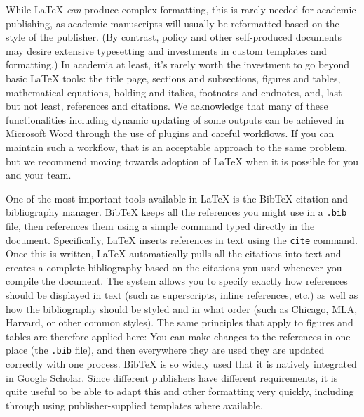 While {\LaTeX} \textit{can} produce complex formatting,
this is rarely needed for academic publishing,
as academic manuscripts will usually be reformatted
based on the style of the publisher.
(By contrast, policy and other self-produced documents may desire
extensive typesetting and investments in custom templates and formatting.)
In academia at least,
it's rarely worth the investment to go beyond basic {\LaTeX} tools:
the title page, sections and subsections,
figures and tables, mathematical equations,
bolding and italics, footnotes and endnotes,
and, last but not least, references and citations.
We acknowledge that many of these functionalities
including dynamic updating of some outputs
can be achieved in Microsoft Word
through the use of plugins and careful workflows.
If you can maintain such a workflow,
that is an acceptable approach to the same problem,
but we recommend moving towards adoption of {\LaTeX}
when it is possible for you and your team.


One of the most important tools available in {\LaTeX}
is the BibTeX citation and bibliography manager.
BibTeX keeps all the references you might use in a \texttt{.bib} file,
then references them using a simple command typed directly in the document.
Specifically, {\LaTeX} inserts references in text using the \texttt{cite} command.
Once this is written, {\LaTeX} automatically pulls all the citations into text
and creates a complete bibliography based on the citations you used whenever you compile the document.
The system allows you to specify exactly how references should be displayed in text
(such as superscripts, inline references, etc.)
as well as how the bibliography should be styled and in what order
(such as Chicago, MLA, Harvard, or other common styles).
The same principles that apply to figures and tables are therefore applied here:
You can make changes to the references in one place (the \texttt{.bib} file),
and then everywhere they are used they are updated correctly with one process.
BibTeX is so widely used that it is natively integrated in Google Scholar.
Since different publishers have different requirements,
it is quite useful to be able to adapt this and other formatting very quickly,
including through using publisher-supplied templates where available.

